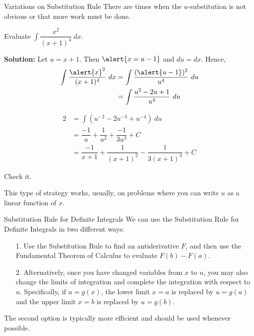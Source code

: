 \documentclass[14pt]{beamer}
\newcommand{\dint}{\displaystyle\int}
\begin{document}
\begin{frame}{\small Variations on Substitution Rule}
\footnotesize
There are times when the $u$-substitution is not obvious or that more work must be done.
\begin{ex} Evaluate $\dint \dfrac{x^2}{(x+1)^4}\ dx.$ \end{ex}

{\bf Solution:}  Let $u=x+1$.  Then $\alert{x=u-1}$ and $du=dx$.  Hence,
\begin{alignat*}{2}
\dint \dfrac{\alert{x}^2}{(x+1)^4}\ dx &= \dint \dfrac{(\alert{u-1})^2}{u^4}\ du \\
&= \dint \dfrac{u^2-2u+1}{u^4}\ du 
\end{alignat*}
\end{frame}

\begin{frame}
\footnotesize
\begin{alignat*}{2}
&= \dint \left(u^{-2}-2u^{-3}+u^{-4} \right) \ du \\
&= \dfrac{-1}{u} + \dfrac{1}{u^2} + \dfrac{-1}{3u^3} + C \\
&= \dfrac{-1}{x+1} + \dfrac{1}{(x+1)^2} - \dfrac{1}{3(x+1)^3} + C
\end{alignat*}

\begin{exe}Check it. \end{exe}

This type of strategy works, usually, on problems where you can write $u$ as a linear function of $x$.
\end{frame}

\begin{frame}{\small Substitution Rule for Definite Integrals}
\footnotesize
We can use the Substitution Rule for Definite Integrals in two different ways:
\begin{itemize}
\item[1.] Use the Substitution Rule to find an antiderivative $F$, and then use the Fundamental Theorem of Calculus to evaluate $F(b)-F(a)$.
\item[2.] Alternatively, once you have changed variables from $x$ to $u$, you may also change the limits of integration and complete the integration with respect to $u$.  Specifically, if $u=g(x)$, the lower limit $x=a$ is replaced by $u=g(a)$ and the upper limit $x=b$ is replaced by $u=g(b)$.
\end{itemize}

\vspace{1pc}
\alert{The second option is typically more efficient and should be used whenever possible.}
\end{frame}
\end{document}
